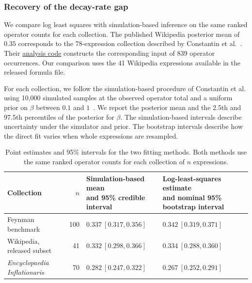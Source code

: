 \documentclass[10pt]{article}
\begin{document}
\subsubsection{Recovery of the decay-rate gap}

We compare log least squares with simulation-based inference on the same ranked operator counts for each collection. The published Wikipedia posterior mean of $0.35$ corresponds to the 78-expression collection described by Constantin et al.~\citep{constantin2026}. Their \href{https://github.com/andrei-const/physics-formulae-patterns/blob/2aa199b5a1d210dacd122f97c3e8086d3e54f752/ili_zipf.py\#L978-L982}{analysis code} constructs the corresponding input of 839 operator occurrences. Our comparison uses the 41 Wikipedia expressions available in the released formula file.

For each collection, we follow the simulation-based procedure of Constantin et al. using 10,000 simulated samples at the observed operator total and a uniform prior on $\beta$ between $0.1$ and $1$~\citep{constantin2026}. We report the posterior mean and the 2.5th and 97.5th percentiles of the posterior for $\beta$. The simulation-based intervals describe uncertainty under the simulator and prior. The bootstrap intervals describe how the direct fit varies when whole expressions are resampled.

\begin{table}[H]
\centering\small
\setlength{\tabcolsep}{5pt}
\begin{tabular}{@{}lrll@{}}
\toprule
Collection & $n$ & \shortstack[l]{Simulation-based mean\\and 95\% credible interval} &
\shortstack[l]{Log-least-squares estimate\\and nominal 95\% bootstrap interval}\\
\midrule
Feynman benchmark & 100 & $0.337\ [0.317,0.356]$ & $0.342\ [0.319,0.371]$\\
Wikipedia, released subset & 41 & $0.332\ [0.298,0.366]$ & $0.334\ [0.288,0.360]$\\
\textit{Encyclopaedia Inflationaris} & 70 & $0.282\ [0.247,0.322]$ & $0.267\ [0.252,0.291]$\\
\bottomrule
\end{tabular}
\caption{Point estimates and 95\% intervals for the two fitting methods. Both methods use the same ranked operator counts for each collection of $n$ expressions.}
\label{tab:decay-recovery}
\end{table}
\end{document}
